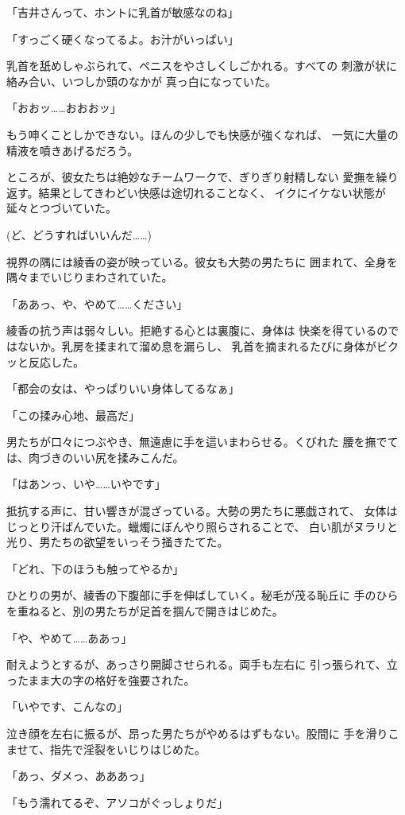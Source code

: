 ﻿\documentclass[
    book,tate,
    line_length=30zw,
    jafontsize=12pt,
    paper=b5j,
    landscape,
    ]{jlreq}
\begin{document}
「吉井さんって、ホントに乳首が敏感なのね」

「すっごく硬くなってるよ。お汁がいっぱい」

乳首を舐めしゃぶられて、ペニスをやさしくしごかれる。すべての
刺激が状に絡み合い、いつしか頭のなかが
真っ白になっていた。

「おおッ……おおおッ」

もう呻くことしかできない。ほんの少しでも快感が強くなれば、
一気に大量の精液を噴きあげるだろう。

ところが、彼女たちは絶妙なチームワークで、ぎりぎり射精しない
愛撫を繰り返す。結果としてきわどい快感は途切れることなく、
イクにイケない状態が延々とつづいていた。

(ど、どうすればいいんだ……)

視界の隅には綾香の姿が映っている。彼女も大勢の男たちに
囲まれて、全身を隅々までいじりまわされていた。

「ああっ、や、やめて……ください」

綾香の抗う声は弱々しい。拒絶する心とは裏腹に、身体は
快楽を得ているのではないか。乳房を揉まれて溜め息を漏らし、
乳首を摘まれるたびに身体がビクッと反応した。

「都会の女は、やっぱりいい身体してるなぁ」

「この揉み心地、最高だ」

男たちが口々につぶやき、無遠慮に手を這いまわらせる。くびれた
腰を撫でては、肉づきのいい尻を揉みこんだ。

「はあンっ、いや……いやです」

抵抗する声に、甘い響きが混ざっている。大勢の男たちに悪戯されて、
女体はじっとり汗ばんでいた。蠟燭にぼんやり照らされることで、
白い肌がヌラリと光り、男たちの欲望をいっそう掻きたてた。

「どれ、下のほうも触ってやるか」

ひとりの男が、綾香の下腹部に手を伸ばしていく。秘毛が茂る恥丘に
手のひらを重ねると、別の男たちが足首を掴んで開きはじめた。

「や、やめて……ああっ」

耐えようとするが、あっさり開脚させられる。両手も左右に
引っ張られて、立ったまま大の字の格好を強要された。

「いやです、こんなの」

泣き顔を左右に振るが、昂った男たちがやめるはずもない。股間に
手を滑りこませて、指先で淫裂をいじりはじめた。

「あっ、ダメっ、あああっ」

「もう濡れてるぞ、アソコがぐっしょりだ」
\end{document}

